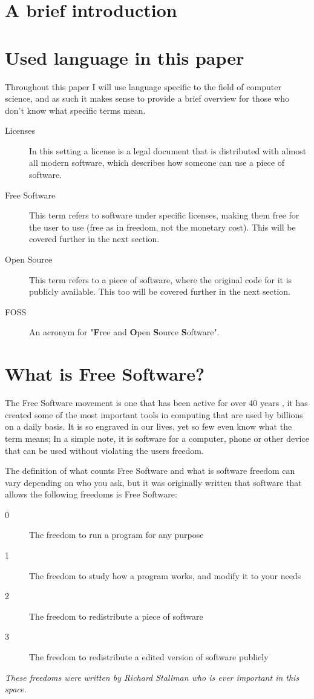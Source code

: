 \documentclass[a4paper,12pt]{article}
\begin{document}
{\setlength{\parindent}{0cm}

\section{A brief introduction}

\section{Used language in this paper} Throughout this paper I will use language specific to the field of computer
science, and as such it makes sense to provide a brief overview for those who don't know what specific terms mean.

\begin{description}
	\item[Licenses] In this setting a license is a legal document that is distributed with
		almost all modern software, which describes how someone can use a piece of software.
	\item[Free Software] This term refers to software under specific licenses, making them
		free for the user to use (free as in freedom, not the monetary cost). This will be covered further
		in the next section.
	\item[Open Source] This term refers to a piece of software, where the original code for it
		is publicly available. This too will be covered further in the next section.
	\item[FOSS] An acronym for "\textbf{F}ree and \textbf{O}pen \textbf{S}ource \textbf{S}oftware".
\end{description}

\section{What is Free Software?} The Free Software movement is one that has been active for over 40 years
\cite{GNUmaifesto}, it has created some of the most important tools in computing that are used by billions on a
daily basis.  It is so engraved in our lives, yet so few even know what the term means; In a simple note, it is
software for a computer, phone or other device that can be used without violating the users freedom.

The definition of what counts Free Software and what is software freedom can vary depending on who you ask, but
it was originally written that software that allows the following freedoms is Free Software:

\begin{description}
	\item[0] The freedom to run a program for any purpose \item[1] The freedom to study how a program works,
	and modify it to your needs \item[2] The freedom to redistribute a piece of software \item[3] The freedom
	to redistribute a edited version of software publicly
\end{description} \textit{These freedoms were written by Richard Stallman\cite{FOSSdef} who is ever
	important in this space.}

}
\end{document}
